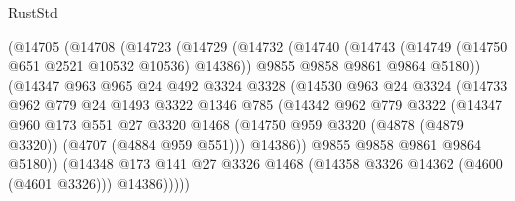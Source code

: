 \begin{lexlean}{RustStd}
\begin{coremodule}
                      (@14705
                        (@14708
                          (@14723
                            (@14729
                              (@14732
                                (@14740
                                  (@14743 (@14749 (@14750 @651 @2521 @10532 @10536) @14386))
                                  @9855
                                  @9858
                                  @9861
                                  @9864
                                  @5180))
                              (@14347
                                @963
                                @965
                                @24
                                @492
                                @3324
                                @3328
                                (@14530
                                  @963
                                  @24
                                  @3324
                                  (@14733
                                    @962
                                    @779
                                    @24
                                    @1493
                                    @3322
                                    @1346
                                    @785
                                    (@14342
                                      @962
                                      @779
                                      @3322
                                      (@14347
                                        @960
                                        @173
                                        @551
                                        @27
                                        @3320
                                        @1468
                                        (@14750
                                          @959
                                          @3320
                                          (@4878 (@4879 @3320))
                                          (@4707 (@4884 @959 @551)))
                                        @14386))
                                    @9855
                                    @9858
                                    @9861
                                    @9864
                                    @5180))
                                (@14348
                                  @173
                                  @141
                                  @27
                                  @3326
                                  @1468
                                  (@14358 @3326 @14362 (@4600 (@4601 @3326)))
                                  @14386)))))

\end{coremodule}
\end{lexlean}

